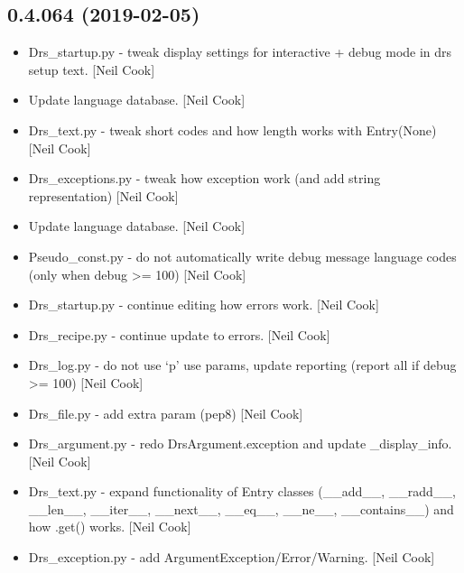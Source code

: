 \documentclass[a4paper,10pt,english]{report}
\begin{document}
\subsection{0.4.064 (2019-02-05)}
\label{\detokenize{misc/changelog:id193}}\begin{itemize}
\item {} 
Drs\_startup.py - tweak display settings for interactive + debug mode
in drs setup text. {[}Neil Cook{]}

\item {} 
Update language database. {[}Neil Cook{]}

\item {} 
Drs\_text.py - tweak short codes and how length works with Entry(None)
{[}Neil Cook{]}

\item {} 
Drs\_exceptions.py - tweak how exception work (and add string
representation) {[}Neil Cook{]}

\item {} 
Update language database. {[}Neil Cook{]}

\item {} 
Pseudo\_const.py - do not automatically write debug message language
codes (only when debug \textgreater{}= 100) {[}Neil Cook{]}

\item {} 
Drs\_startup.py - continue editing how errors work. {[}Neil Cook{]}

\item {} 
Drs\_recipe.py - continue update to errors. {[}Neil Cook{]}

\item {} 
Drs\_log.py - do not use ‘p’ use params, update reporting (report all
if debug \textgreater{}= 100) {[}Neil Cook{]}

\item {} 
Drs\_file.py - add extra param (pep8) {[}Neil Cook{]}

\item {} 
Drs\_argument.py - redo DrsArgument.exception and update \_display\_info.
{[}Neil Cook{]}

\item {} 
Drs\_text.py - expand functionality of Entry classes (\_\_add\_\_,
\_\_radd\_\_, \_\_len\_\_, \_\_iter\_\_, \_\_next\_\_, \_\_eq\_\_, \_\_ne\_\_, \_\_contains\_\_)
and how .get() works. {[}Neil Cook{]}

\item {} 
Drs\_exception.py - add ArgumentException/Error/Warning. {[}Neil Cook{]}


\end{itemize}
\end{document}
